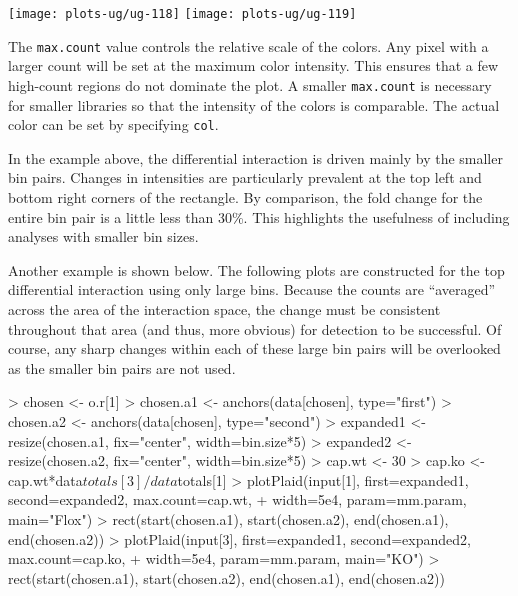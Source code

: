 \documentclass[12pt]{report}
\renewenvironment{Schunk}{\vspace{0pt}}{\vspace{0pt}}
\newcommand{\code}[1]{{\small\texttt{#1}}}
\begin{document}
\begin{center}
\texttt{[image: plots-ug/ug-118]}
\texttt{[image: plots-ug/ug-119]}
\end{center}

The \code{max.count} value controls the relative scale of the colors. 
Any pixel with a larger count will be set at the maximum color intensity.
This ensures that a few high-count regions do not dominate the plot.
A smaller \code{max.count} is necessary for smaller libraries so that the intensity of the colors is comparable.
The actual color can be set by specifying \code{col}.

In the example above, the differential interaction is driven mainly by the smaller bin pairs.
Changes in intensities are particularly prevalent at the top left and bottom right corners of the rectangle.
By comparison, the fold change for the entire bin pair is a little less than 30\%.
This highlights the usefulness of including analyses with smaller bin sizes.

Another example is shown below.
The following plots are constructed for the top differential interaction using only large bins.
Because the counts are ``averaged'' across the area of the interaction space, the change must be consistent throughout that area (and thus, more obvious) for detection to be successful.
Of course, any sharp changes within each of these large bin pairs will be overlooked as the smaller bin pairs are not used.




\begin{Schunk}
\begin{Sinput}
> chosen <- o.r[1]
> chosen.a1 <- anchors(data[chosen], type="first")
> chosen.a2 <- anchors(data[chosen], type="second")
> expanded1 <- resize(chosen.a1, fix="center", width=bin.size*5)
> expanded2 <- resize(chosen.a2, fix="center", width=bin.size*5)
> cap.wt <- 30
> cap.ko <- cap.wt*data$totals[3]/data$totals[1]
> plotPlaid(input[1], first=expanded1, second=expanded2, max.count=cap.wt, 
+     width=5e4, param=mm.param, main="Flox")
> rect(start(chosen.a1), start(chosen.a2), end(chosen.a1), end(chosen.a2))
> plotPlaid(input[3], first=expanded1, second=expanded2, max.count=cap.ko, 
+     width=5e4, param=mm.param, main="KO")
> rect(start(chosen.a1), start(chosen.a2), end(chosen.a1), end(chosen.a2))
\end{Sinput}
\end{Schunk}
\end{document}
